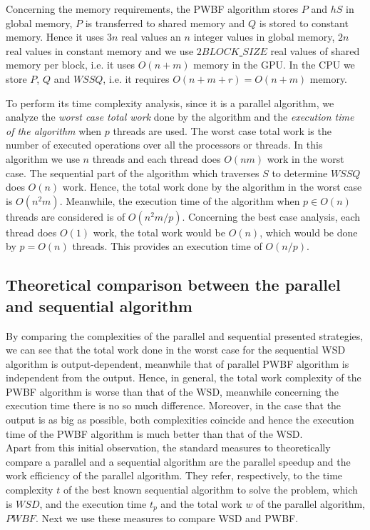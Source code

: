 \documentclass[11pt,onecolumn]{elsart3p}
\begin{document}
\vspace{1.5em}

         Concerning the memory requirements, the PWBF algorithm stores $P$ and $hS$ in global memory, $P$ is transferred to shared memory and $Q$ is stored to constant memory. Hence it uses $3n$ real values an $n$ integer values in global memory, $2n$ real values in constant memory and we use $2 BLOCK$\underline{ }$SIZE$ real values of shared memory per block, i.e. it uses $O(n+m)$ memory in the GPU. In the CPU we store $P$, $Q$ and $WSSQ$, i.e. it requires $O(n+m+r)=O(n+m)$ memory.

        To perform its time complexity analysis, since it is a parallel algorithm, we analyze the {\it worst case total work} done by the algorithm and the {\it execution time of the algorithm} when $p$ threads are used. The worst case total work is the number of executed operations over all the processors or threads. In this algorithm we use $n$ threads and each thread does $O(nm)$ work in the worst case. The sequential part of the algorithm which traverses $S$ to determine $WSSQ$ does $O(n)$ work. Hence, the total work done by the algorithm in the worst case is $O(n^2 m)$. Meanwhile, the execution time of the algorithm when $p \in O(n)$ threads are considered is of $O(n^2m/p)$. Concerning the best case analysis, each thread does $O(1)$ work, the total work would be $O(n)$, which would be done by $p=O(n)$ threads. This provides an execution time of $O(n/p)$.

\subsection{Theoretical comparison between the parallel and sequential algorithm}
        By comparing the complexities of the parallel and sequential presented strategies, we can see that the total work done in the worst case for the sequential WSD algorithm is output-dependent, meanwhile that of parallel PWBF algorithm is independent from the output. Hence, in general, the total work complexity of the PWBF algorithm is worse than that of the WSD, meanwhile concerning the execution time there is no so much difference. Moreover, in the case that the output is as big as possible, both complexities coincide and hence the execution time of the PWBF algorithm is much better than that of the WSD.\\


        Apart from this initial observation, the standard measures to theoretically compare a parallel and a sequential algorithm are the parallel speedup and the work efficiency of the parallel algorithm. They refer, respectively, to the time complexity $t$ of the best known sequential algorithm to solve the problem, which is $WSD$, and the execution time $t_p$ and the total work $w$ of the parallel algorithm, $PWBF$. Next we use these measures to compare WSD and PWBF.\\
\end{document}
